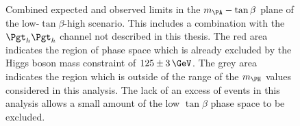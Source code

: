 \begin{figure}
\begin{center}

\end{center}
\caption[Combined expected and observed limits in the $m_{\PA}-\tan\beta$ plane
of the low-$\tan\beta$-high scenario.]{
Combined expected and observed limits in the $m_{\PA}-\tan\beta$ plane
of the low-$\tan\beta$-high scenario.
This includes a combination with the $\tautau$ channel not
described in this thesis. The red area indicates the region of phase space which is already
excluded by the Higgs boson mass constraint of $125\pm3\,\GeV$. The grey area
indicates the region which is outside of the range of the $m_{\PH}$ values
considered in this analysis. The lack of an excess of events in this analysis
allows a small amount of the low $\tan\beta$ phase space to be excluded.}
\label{fig:lowtanbhigh}
\end{figure}
